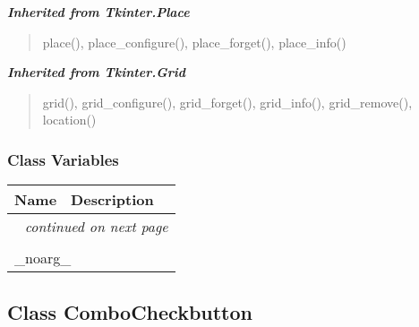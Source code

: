 \large{\textbf{\textit{Inherited from Tkinter.Place}}}

\begin{quote}
place(), place\_configure(), place\_forget(), place\_info()
\end{quote}

\large{\textbf{\textit{Inherited from Tkinter.Grid}}}

\begin{quote}
grid(), grid\_configure(), grid\_forget(), grid\_info(), grid\_remove(), location()
\end{quote}


  \subsubsection{Class Variables}

    \vspace{-1cm}
\hspace{\varindent}\begin{longtable}{|p{\varnamewidth}|p{\vardescrwidth}|l}
\cline{1-2}
\cline{1-2} \centering \textbf{Name} & \centering \textbf{Description}& \\
\cline{1-2}
\endhead\cline{1-2}\multicolumn{3}{r}{\small\textit{continued on next page}}\\\endfoot\cline{1-2}
\endlastfoot\multicolumn{2}{|l|}{\textit{Inherited from Tkinter.Misc}}\\
\multicolumn{2}{|p{\varwidth}|}{\raggedright \_noarg\_}\\
\cline{1-2}
\end{longtable}



\subsection{Class ComboCheckbutton}

